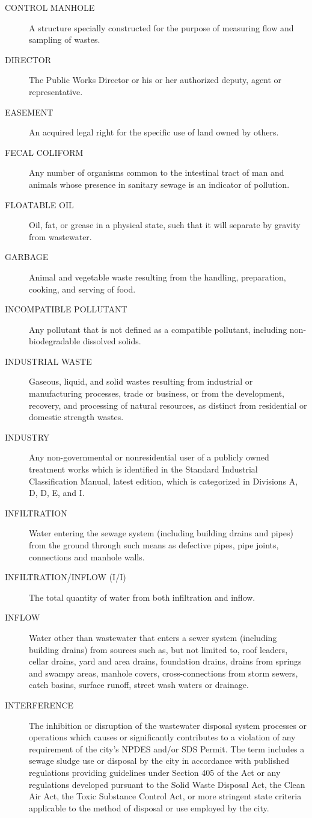 \begin{description}
\item[CONTROL MANHOLE] A structure specially constructed for the purpose of measuring flow and sampling of wastes.
\item[DIRECTOR] The Public Works Director or his or her authorized deputy, agent or representative.
\item[EASEMENT] An acquired legal right for the specific use of land owned by others.
\item[FECAL COLIFORM] Any number of organisms common to the intestinal tract of man and animals whose presence in sanitary sewage is an indicator of pollution.
\item[FLOATABLE OIL] Oil, fat, or grease in a physical state, such that it will separate by gravity from wastewater.
\item[GARBAGE] Animal and vegetable waste resulting from the handling, preparation, cooking, and serving of food.
\item[INCOMPATIBLE POLLUTANT] Any pollutant that is not defined as a compatible pollutant, including non-biodegradable dissolved solids.
\item[INDUSTRIAL WASTE] Gaseous, liquid, and solid wastes resulting from industrial or manufacturing processes, trade or business, or from the development, recovery, and processing of natural resources, as distinct from residential or domestic strength wastes.
\item[INDUSTRY] Any non-governmental or nonresidential user of a publicly owned treatment works which is identified in the Standard Industrial Classification Manual, latest edition, which is categorized in Divisions A, D, D, E, and I.
\item[INFILTRATION] Water entering the sewage system (including building drains and pipes) from the ground through such means as defective pipes, pipe joints, connections and manhole walls.
\item[INFILTRATION/INFLOW (I/I)] The total quantity of water from both infiltration and inflow.
\item[INFLOW] Water other than wastewater that enters a sewer system (including building drains) from sources such as, but not limited to, roof leaders, cellar drains, yard and area drains, foundation drains, drains from springs and swampy areas, manhole covers, cross-connections from storm sewers, catch basins, surface runoff, street wash waters or drainage.
\item[INTERFERENCE] The inhibition or disruption of the wastewater disposal system processes or operations which causes or significantly contributes to a violation of any requirement of the city’s NPDES and/or SDS Permit. The term includes a sewage sludge use or disposal by the city in accordance with published regulations providing guidelines under Section 405 of the Act or any regulations developed pursuant to the Solid Waste Disposal Act, the Clean Air Act, the Toxic Substance Control Act, or more stringent state criteria applicable to the method of disposal or use employed by the city.

\end{description}
